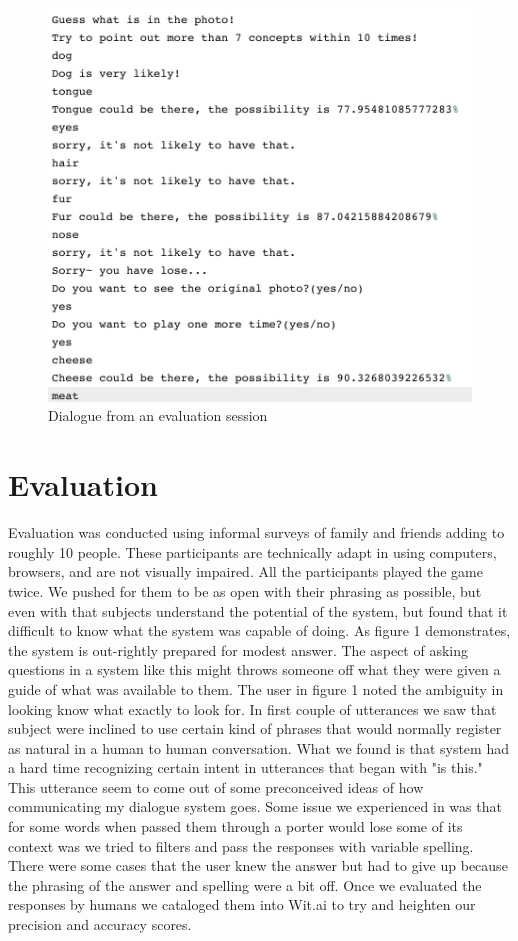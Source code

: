 \documentclass[11pt,a4paper]{article}
\begin{document}
\begin{figure}
    \includegraphics[width=\linewidth]{dialex.jpg}
    \caption{Dialogue from an evaluation session}
\end{figure}
\section*{Evaluation}

Evaluation was conducted using informal surveys of family and friends adding to roughly 10 people. These participants are technically adapt in using computers, browsers, and are not visually impaired. All the participants played the game twice. We pushed for them to be as open with their phrasing as possible, but even with that subjects understand the potential of the system, but found that it difficult to know what the system was capable of doing. As figure 1 demonstrates, the system is out-rightly prepared for modest answer. The aspect of asking questions in a system like this might throws someone off what they were given a guide of what was available to them. 
The user in figure 1 noted the ambiguity in looking know what exactly to look for. In first couple of utterances we saw that subject were inclined to use certain kind of phrases that would normally register as natural in a human to human conversation. What we found is that system had a hard time recognizing certain intent in utterances that began with "is this." This utterance seem to come out of some preconceived ideas of how communicating my dialogue system goes. Some issue we experienced in was that for some words when passed them through a porter would lose some of its context was we tried to filters and pass the responses with variable spelling. There were some cases that the user knew the answer but had to give up because the phrasing of the answer and spelling were a bit off. Once we evaluated the responses by humans we cataloged them into Wit.ai to try and heighten our precision and accuracy scores. \\
\end{document}

